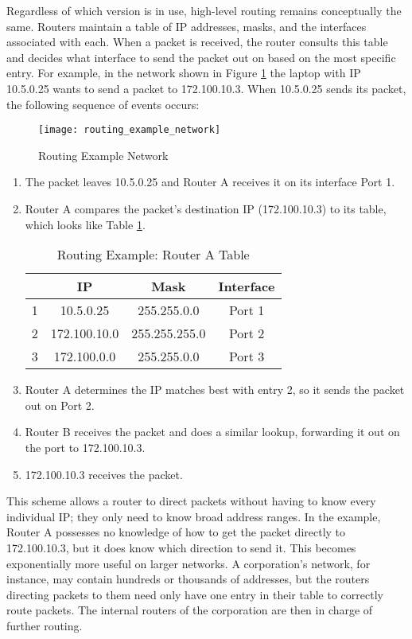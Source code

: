 \par Regardless of which version is in use, high-level routing remains conceptually the same. Routers maintain a table of \ac{IP} addresses, masks, and the interfaces associated with each. When a packet is received, the router consults this table and decides what interface to send the packet out on based on the most specific entry. For example, in the network shown in Figure \ref{fig:routing_example_network} the laptop with \ac{IP} 10.5.0.25 wants to send a packet to 172.100.10.3. When 10.5.0.25 sends its packet, the following sequence of events occurs:

\begin{figure}
\caption{Routing Example Network}
\label{fig:routing_example_network}
\centering
\texttt{[image: routing\_example\_network]}
\end{figure}

\begin{enumerate}[1.]
\item The packet leaves 10.5.0.25 and Router A receives it on its interface Port 1.
\item Router A compares the packet's destination \ac{IP} (172.100.10.3) to its table, which looks like Table \ref{tbl:routing_example_routera_table}.
	\begin{table}[h]
	\caption{Routing Example: Router A Table}
	\label{tbl:routing_example_routera_table}
	\centering
	\begin{tabular}{r|c|c|c}
	 & \ac{IP} & Mask & Interface\\
	\hline
	1 & 10.5.0.25 & 255.255.0.0 & Port 1\\
	2 & 172.100.10.0 & 255.255.255.0 & Port 2\\
	3 & 172.100.0.0 & 255.255.0.0 & Port 3\\
	\end{tabular}
	\end{table}
\item Router A determines the \ac{IP} matches best with entry 2, so it sends the packet out on Port 2.
\item Router B receives the packet and does a similar lookup, forwarding it out on the port to 172.100.10.3.
\item 172.100.10.3 receives the packet.
\end{enumerate}

\par This scheme allows a router to direct packets without having to know every individual IP; they only need to know broad address ranges. In the example, Router A possesses no knowledge of how to get the packet directly to 172.100.10.3, but it does know which direction to send it. This becomes exponentially more useful on larger networks. A corporation's network, for instance, may contain hundreds or thousands of addresses, but the routers directing packets to them need only have one entry in their table to correctly route packets. The internal routers of the corporation are then in charge of further routing.

